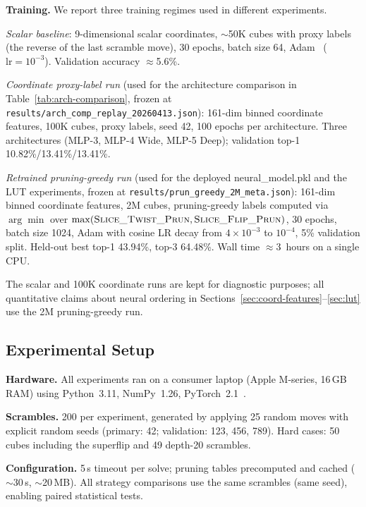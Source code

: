 \documentclass[graybox]{svmult}
\begin{document}
\textbf{Training.} We report three training regimes used in different experiments.
\begin{enumerate}[leftmargin=*]
\begin{sloppypar}
  \item \emph{Scalar baseline}: 9-dimensional scalar coordinates, $\sim$50K cubes with proxy labels (the reverse of the last scramble move), 30 epochs, batch size 64, Adam~\cite{kingma2015} ($\text{lr}=10^{-3}$). Validation accuracy $\approx$5.6\%.
  \item \emph{Coordinate proxy-label run} (used for the architecture comparison in Table~\ref{tab:arch-comparison}, frozen at \texttt{results/\allowbreak arch\_comp\_replay\_20260413.json}): 161-dim binned coordinate features, 100K cubes, proxy labels, seed 42, 100 epochs per architecture. Three architectures (MLP-3, MLP-4 Wide, MLP-5 Deep); validation top-1 10.82\%/13.41\%/13.41\%.
  \item \emph{Retrained pruning-greedy run} (used for the deployed neural\_model.pkl and the LUT experiments, frozen at \texttt{results/\allowbreak prun\_greedy\_2M\_meta.json}): 161-dim binned coordinate features, 2M cubes, pruning-greedy labels computed via $\arg\min$ over $\max(\textsc{Slice\_Twist\_Prun}, \textsc{Slice\_Flip\_Prun})$, 30 epochs, batch size 1024, Adam with cosine LR decay from $4 \times 10^{-3}$ to $10^{-4}$, 5\% validation split. Held-out best top-1 43.94\%, top-3 64.48\%. Wall time $\approx$3~hours on a single CPU.
\end{sloppypar}
\end{enumerate}
The scalar and 100K coordinate runs are kept for diagnostic purposes; all quantitative claims about neural ordering in Sections~\ref{sec:coord-features}--\ref{sec:lut} use the 2M pruning-greedy run.

\subsection{Experimental Setup}
\label{sec:setup}

\textbf{Hardware.} All experiments ran on a consumer laptop (Apple M-series, 16\,GB RAM) using Python~3.11, NumPy~1.26, PyTorch~2.1~\cite{paszke2019}.

\textbf{Scrambles.} 200 per experiment, generated by applying 25 random moves with explicit random seeds (primary: 42; validation: 123, 456, 789). Hard cases: 50 cubes including the superflip and 49 depth-20 scrambles.

\textbf{Configuration.} 5\,s timeout per solve; pruning tables precomputed and cached ($\sim$30\,s, $\sim$20\,MB). All strategy comparisons use the same scrambles (same seed), enabling paired statistical tests.
\end{document}
